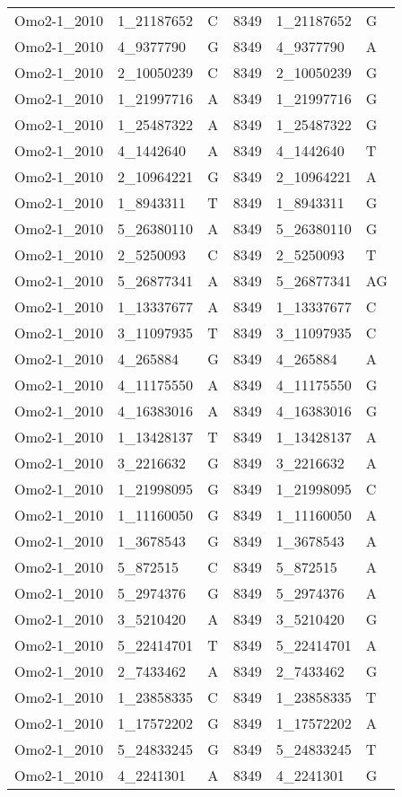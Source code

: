 \begin{center}
\begin{longtable}{|l|l|l|l|l|l|}
Omo2-1\_2010&1\_21187652&C&8349&1\_21187652&G\\
Omo2-1\_2010&4\_9377790&G&8349&4\_9377790&A\\
Omo2-1\_2010&2\_10050239&C&8349&2\_10050239&G\\
Omo2-1\_2010&1\_21997716&A&8349&1\_21997716&G\\
Omo2-1\_2010&1\_25487322&A&8349&1\_25487322&G\\
Omo2-1\_2010&4\_1442640&A&8349&4\_1442640&T\\
Omo2-1\_2010&2\_10964221&G&8349&2\_10964221&A\\
Omo2-1\_2010&1\_8943311&T&8349&1\_8943311&G\\
Omo2-1\_2010&5\_26380110&A&8349&5\_26380110&G\\
Omo2-1\_2010&2\_5250093&C&8349&2\_5250093&T\\
Omo2-1\_2010&5\_26877341&A&8349&5\_26877341&AG\\
Omo2-1\_2010&1\_13337677&A&8349&1\_13337677&C\\
Omo2-1\_2010&3\_11097935&T&8349&3\_11097935&C\\
Omo2-1\_2010&4\_265884&G&8349&4\_265884&A\\
Omo2-1\_2010&4\_11175550&A&8349&4\_11175550&G\\
Omo2-1\_2010&4\_16383016&A&8349&4\_16383016&G\\
Omo2-1\_2010&1\_13428137&T&8349&1\_13428137&A\\
Omo2-1\_2010&3\_2216632&G&8349&3\_2216632&A\\
Omo2-1\_2010&1\_21998095&G&8349&1\_21998095&C\\
Omo2-1\_2010&1\_11160050&G&8349&1\_11160050&A\\
Omo2-1\_2010&1\_3678543&G&8349&1\_3678543&A\\
Omo2-1\_2010&5\_872515&C&8349&5\_872515&A\\
Omo2-1\_2010&5\_2974376&G&8349&5\_2974376&A\\
Omo2-1\_2010&3\_5210420&A&8349&3\_5210420&G\\
Omo2-1\_2010&5\_22414701&T&8349&5\_22414701&A\\
Omo2-1\_2010&2\_7433462&A&8349&2\_7433462&G\\
Omo2-1\_2010&1\_23858335&C&8349&1\_23858335&T\\
Omo2-1\_2010&1\_17572202&G&8349&1\_17572202&A\\
Omo2-1\_2010&5\_24833245&G&8349&5\_24833245&T\\
Omo2-1\_2010&4\_2241301&A&8349&4\_2241301&G\\

\end{longtable}
\end{center}
